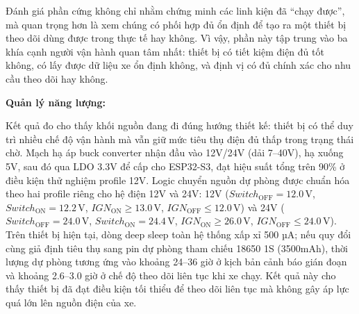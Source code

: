 \documentclass[a4paper]{extarticle}
\begin{document}
Đánh giá phần cứng không chỉ nhằm chứng minh các linh kiện đã ``chạy
được'', mà quan trọng hơn là xem chúng có phối hợp đủ ổn định để tạo ra
một thiết bị theo dõi dùng được trong thực tế hay không. Vì vậy, phần
này tập trung vào ba khía cạnh người vận hành quan tâm nhất: thiết bị có
tiết kiệm điện đủ tốt không, có lấy được dữ liệu xe ổn định không, và
định vị có đủ chính xác cho nhu cầu theo dõi hay không.

\textbf{Quản lý năng lượng:}

Kết quả đo cho thấy khối nguồn đang đi đúng hướng thiết kế: thiết bị có
thể duy trì nhiều chế độ vận hành mà vẫn giữ mức tiêu thụ điện đủ thấp
trong trạng thái chờ. Mạch hạ áp buck converter nhận đầu vào 12V/24V
(dải 7--40V), hạ xuống 5V, sau đó qua LDO 3.3V để cấp cho ESP32-S3, đạt
hiệu suất tổng trên 90\% ở điều kiện thử nghiệm profile 12V. Logic
chuyển nguồn dự phòng được chuẩn hóa theo hai profile riêng cho hệ điện
12V và 24V:
12V (\(Switch_{\mathrm{OFF}} = 12.0\,\mathrm{V}\),
\(Switch_{\mathrm{ON}} = 12.2\,\mathrm{V}\),
\(IGN_{\mathrm{ON}} \ge 13.0\,\mathrm{V}\),
\(IGN_{\mathrm{OFF}} \le 12.0\,\mathrm{V}\)) và
24V (\(Switch_{\mathrm{OFF}} = 24.0\,\mathrm{V}\),
\(Switch_{\mathrm{ON}} = 24.4\,\mathrm{V}\),
\(IGN_{\mathrm{ON}} \ge 26.0\,\mathrm{V}\),
\(IGN_{\mathrm{OFF}} \le 24.0\,\mathrm{V}\)). Trên thiết bị hiện tại, dòng deep
sleep toàn hệ thống xấp xỉ 500 µA; nếu quy đổi cùng giả định tiêu thụ
sang pin dự phòng tham chiếu 18650 1S (3500mAh), thời lượng dự phòng
tương ứng vào khoảng 24--36 giờ ở kịch bản cảnh báo gián đoạn và khoảng
2.6--3.0 giờ ở chế độ theo dõi liên tục khi xe chạy. Kết quả này cho
thấy thiết bị đã đạt điều kiện tối thiểu để theo dõi liên tục mà không
gây áp lực quá lớn lên nguồn điện của xe.
\end{document}
